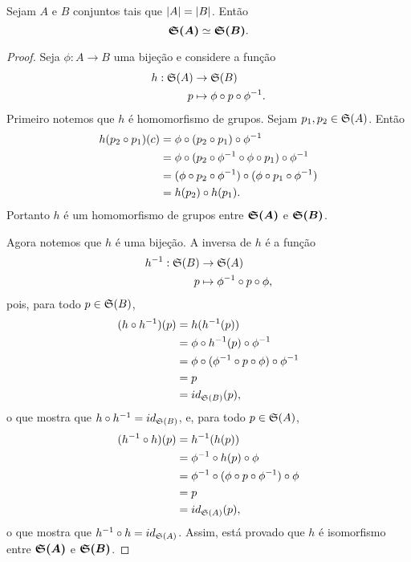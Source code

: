 \begin{prop}
	Sejam $A$ e $B$ conjuntos tais que $\left\vert{A}\right\vert = \left\vert{B}\right\vert$. Então
	\begin{equation*}
	\bm{\mathfrak{S}(A)} \simeq \bm{\mathfrak{S}(B)}.
	\end{equation*}
\end{prop}
\begin{proof}
	Seja $\phi: A \to B$ uma bijeção e considere a função
	\begin{align*}
	h : \mathfrak{S}(A) &\to \mathfrak{S}(B) \\
			p &\mapsto \phi \circ p \circ \phi^{-1}.
	\end{align*}
Primeiro notemos que $h$ é homomorfismo de grupos. Sejam $p_1,p_2 \in \mathfrak{S}(A)$. Então
	\begin{align*}
	h(p_2 \circ p_1)(c) &= \phi \circ (p_2 \circ p_1) \circ \phi^{-1} \\
			&= \phi \circ (p_2 \circ \phi^{-1} \circ \phi \circ p_1) \circ \phi^{-1} \\
			&= (\phi \circ p_2 \circ \phi^{-1}) \circ (\phi \circ p_1 \circ \phi^{-1}) \\
			&= h(p_2) \circ h(p_1).
	\end{align*}
Portanto $h$ é um homomorfismo de grupos entre $\bm{\mathfrak{S}(A)}$ e $\bm{\mathfrak{S}(B)}$.

Agora notemos que $h$ é uma bijeção. A inversa de $h$ é a função
	\begin{align*}
	h^{-1} : \mathfrak{S}(B) &\to \mathfrak{S}(A) \\
			p &\mapsto \phi^{-1} \circ p \circ \phi,
	\end{align*}
pois, para todo $p \in \mathfrak{S}(B)$,
	\begin{align*}
	(h \circ h^{-1}) (p) &= h (h^{-1}(p)) \\
			&= \phi \circ h^{-1}(p) \circ \phi^{-1} \\
			&= \phi \circ (\phi^{-1} \circ p \circ \phi) \circ \phi^{-1} \\
			&= p \\
			&= id_{\mathfrak{S}(B)}(p),
	\end{align*}
o que mostra que $h \circ h^{-1} = id_{\mathfrak{S}(B)}$, e, para todo $p \in \mathfrak{S}(A)$,
	\begin{align*}
	(h^{-1} \circ h) (p) &= h^{-1} (h(p)) \\
			&= \phi^{-1} \circ h(p) \circ \phi \\
			&= \phi^{-1} \circ (\phi \circ p \circ \phi^{-1}) \circ \phi \\
			&= p \\
			&= id_{\mathfrak{S}(A)}(p),
	\end{align*}
o que mostra que $h^{-1} \circ h = id_{\mathfrak{S}(A)}$. Assim, está provado que $h$ é isomorfismo entre $\bm{\mathfrak{S}(A)}$ e $\bm{\mathfrak{S}(B)}$.
\end{proof}


